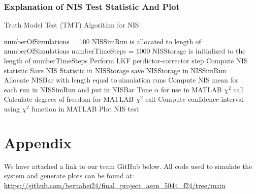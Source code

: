 \documentclass[paper=a4, fontsize=11pt]{scrartcl} %
\numberwithin{equation}{section} %
\numberwithin{figure}{section} %
\numberwithin{table}{section} %
\begin{document}
\begin{framed}
\newpage
\subsubsection{Explanation of NIS Test Statistic And Plot}
\begin{algorithm}[H]
\caption{Truth Model Test (TMT) Algorithm for NIS}\label{alg:TMT_nis_algo}
\begin{algorithmic}[1] %
\State numberOfSimulations = 100
\State NISSimRun is allocated to length of numberOfSimulations
\State numberTimeSteps = 1000
\State NISStorage is initialized to the length of numberTimeSteps
\State Perform LKF perdictor-corrector step
\State Compute NIS statistic
\State Save NIS Statistic in NISStorage
\EndWhile
\State save NISStorage in NISSimRun
\EndWhile
\State Allocate NISBar with length equal to simulation runs
\State Compute NIS mean for each run in NISSimRun and put in NISBar
\State Tune $\alpha$ for use in MATLAB $\chi^2$ call
\State Calculate degrees of freedom for MATLAB $\chi^2$ call 
\State Compute confidence interval using $\chi^2$  function in MATLAB
\State Plot NIS test
\end{algorithmic}
\end{algorithm}

\end{framed}




\newpage
\section{Appendix}
\begin{framed}

We have attached a link to our team GitHub below. All code used to simulate the system and generate plots can be found at:
\\
\url{https://github.com/bernabei24/final_project_asen_5044_f24/tree/main}

\end{framed}


   
\end{document}
